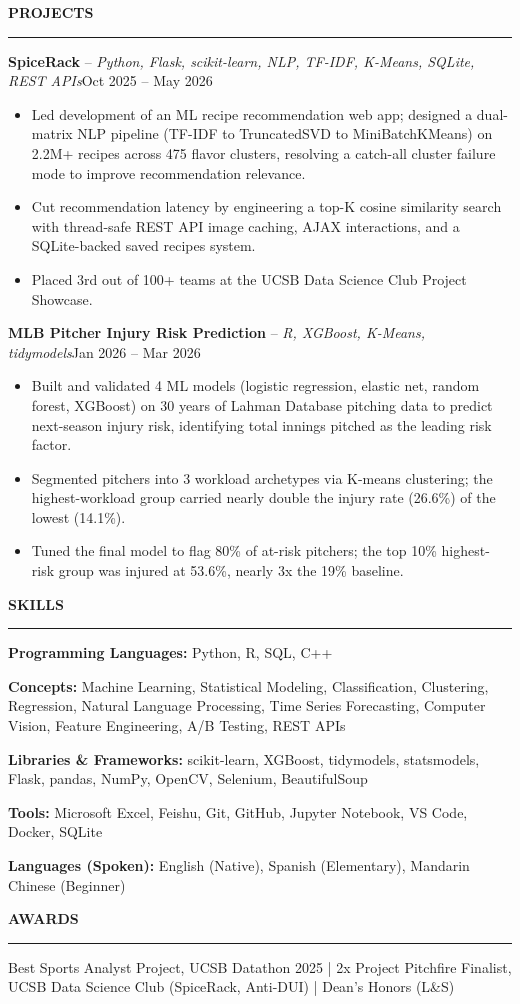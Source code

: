 \documentclass[letterpaper,10pt]{article}
\newcommand{\resumeSection}[1]{%
  \vspace{3pt}%
  {\large\bfseries #1}\par
  \vspace{-4pt}\rule{\linewidth}{0.4pt}\par
  \vspace{1pt}%
}
\newcommand{\projectEntry}[2]{%
  #1\hfill #2\par
}
\newenvironment{bullets}{\begin{itemize}}{\end{itemize}\vspace{1pt}}
\begin{document}
\resumeSection{PROJECTS}
\projectEntry{\textbf{SpiceRack} -- \textit{Python, Flask, scikit-learn, NLP, TF-IDF, K-Means, SQLite, REST APIs}}{Oct 2025 -- May 2026}
\begin{bullets}
  \item Led development of an ML recipe recommendation web app; designed a dual-matrix NLP pipeline (TF-IDF to TruncatedSVD to MiniBatchKMeans) on 2.2M+ recipes across 475 flavor clusters, resolving a catch-all cluster failure mode to improve recommendation relevance.
  \item Cut recommendation latency by engineering a top-K cosine similarity search with thread-safe REST API image caching, AJAX interactions, and a SQLite-backed saved recipes system.
  \item Placed 3rd out of 100+ teams at the UCSB Data Science Club Project Showcase.
\end{bullets}
\projectEntry{\textbf{MLB Pitcher Injury Risk Prediction} -- \textit{R, XGBoost, K-Means, tidymodels}}{Jan 2026 -- Mar 2026}
\begin{bullets}
  \item Built and validated 4 ML models (logistic regression, elastic net, random forest, XGBoost) on 30 years of Lahman Database pitching data to predict next-season injury risk, identifying total innings pitched as the leading risk factor.
  \item Segmented pitchers into 3 workload archetypes via K-means clustering; the highest-workload group carried nearly double the injury rate (26.6\%) of the lowest (14.1\%).
  \item Tuned the final model to flag 80\% of at-risk pitchers; the top 10\% highest-risk group was injured at 53.6\%, nearly 3x the 19\% baseline.
\end{bullets}

\resumeSection{SKILLS}
\textbf{Programming Languages:} Python, R, SQL, C++\par
\textbf{Concepts:} Machine Learning, Statistical Modeling, Classification, Clustering, Regression, Natural Language Processing, Time Series Forecasting, Computer Vision, Feature Engineering, A/B Testing, REST APIs\par
\textbf{Libraries \& Frameworks:} scikit-learn, XGBoost, tidymodels, statsmodels, Flask, pandas, NumPy, OpenCV, Selenium, BeautifulSoup\par
\textbf{Tools:} Microsoft Excel, Feishu, Git, GitHub, Jupyter Notebook, VS Code, Docker, SQLite\par
\textbf{Languages (Spoken):} English (Native), Spanish (Elementary), Mandarin Chinese (Beginner)\par

\resumeSection{AWARDS}
Best Sports Analyst Project, UCSB Datathon 2025 | 2x Project Pitchfire Finalist, UCSB Data Science Club (SpiceRack, Anti-DUI) | Dean's Honors (L\&S)\par
\end{document}
